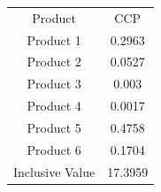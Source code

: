 \begin{tabular}{cc}
Product & CCP \\
Product 1 & 0.2963 \\
Product 2 & 0.0527 \\
Product 3 & 0.003 \\
Product 4 & 0.0017 \\
Product 5 & 0.4758 \\
Product 6 & 0.1704 \\
Inclusive Value & 17.3959 \\
\end{tabular}